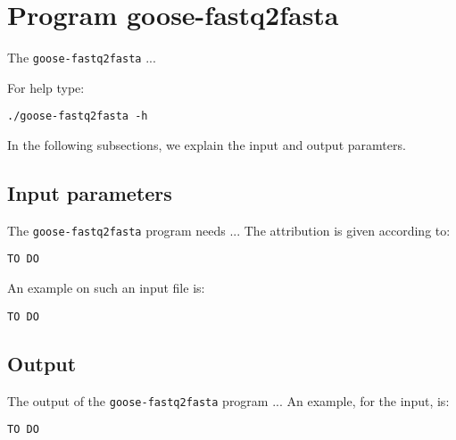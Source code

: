\section{Program goose-fastq2fasta}
The \texttt{goose-fastq2fasta} ...

For help type:
\begin{lstlisting}
./goose-fastq2fasta -h
\end{lstlisting}
In the following subsections, we explain the input and output paramters.

\subsection*{Input parameters}

The \texttt{goose-fastq2fasta} program needs ...
The attribution is given according to:
\begin{lstlisting}
TO DO
\end{lstlisting}

An example on such an input file is:
\begin{lstlisting}
TO DO
\end{lstlisting}

\subsection*{Output}
The output of the \texttt{goose-fastq2fasta} program ...
An example, for the input, is:
\begin{lstlisting}
TO DO
\end{lstlisting}
